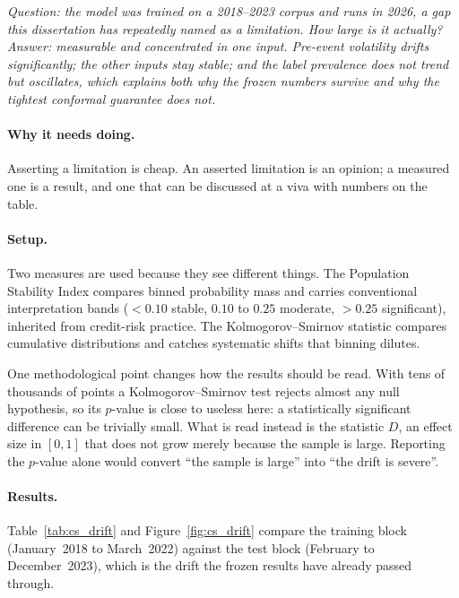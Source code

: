 \emph{Question: the model was trained on a 2018--2023 corpus and runs in 2026, a gap this
dissertation has repeatedly named as a limitation. How large is it actually? Answer: measurable and
concentrated in one input. Pre-event volatility drifts significantly; the other inputs stay stable;
and the label prevalence does not trend but oscillates, which explains both why the frozen numbers
survive and why the tightest conformal guarantee does not.}

\paragraph{Why it needs doing.} Asserting a limitation is cheap. An asserted limitation is an
opinion; a measured one is a result, and one that can be discussed at a viva with numbers on the
table.

\paragraph{Setup.} Two measures are used because they see different things. The Population Stability
Index compares binned probability mass and carries conventional interpretation bands ($<0.10$ stable,
$0.10$ to $0.25$ moderate, $>0.25$ significant), inherited from credit-risk practice. The
Kolmogorov--Smirnov statistic compares cumulative distributions and catches systematic shifts that
binning dilutes.

One methodological point changes how the results should be read. With tens of thousands of points a
Kolmogorov--Smirnov test rejects almost any null hypothesis, so its $p$-value is close to useless
here: a statistically significant difference can be trivially small. What is read instead is the
statistic $D$, an effect size in $[0,1]$ that does not grow merely because the sample is large.
Reporting the $p$-value alone would convert ``the sample is large'' into ``the drift is severe''.

\paragraph{Results.} Table~\ref{tab:cs_drift} and Figure~\ref{fig:cs_drift} compare the training
block (January~2018 to March~2022) against the test block (February to December~2023), which is the
drift the frozen results have already passed through.

